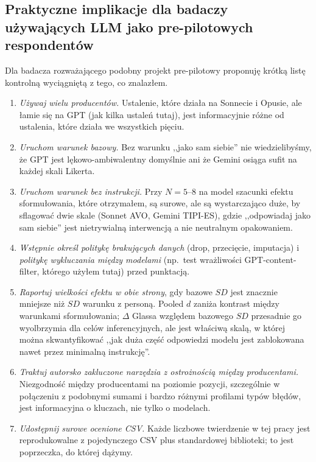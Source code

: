 \documentclass[11pt,a4paper]{article}
\begin{document}
\subsection{Praktyczne implikacje dla badaczy używających LLM jako pre-pilotowych respondentów}

Dla badacza rozważającego podobny projekt pre-pilotowy proponuję krótką listę kontrolną wyciągniętą z tego, co znalazłem.

\begin{enumerate}
\item \emph{Używaj wielu producentów.} Ustalenie, które działa na Sonnecie i Opusie, ale łamie się na GPT (jak kilka ustaleń tutaj), jest informacyjnie różne od ustalenia, które działa we wszystkich pięciu.
\item \emph{Uruchom warunek bazowy.} Bez warunku ,,jako sam siebie'' nie wiedzielibyśmy, że GPT jest lękowo-ambiwalentny domyślnie ani że Gemini osiąga sufit na każdej skali Likerta.
\item \emph{Uruchom warunek bez instrukcji.} Przy $N = 5$--$8$ na model szacunki efektu sformułowania, które otrzymałem, są surowe, ale są wystarczająco duże, by sflagować dwie skale (Sonnet AVO, Gemini TIPI-ES), gdzie ,,odpowiadaj jako sam siebie'' jest nietrywialną interwencją a nie neutralnym opakowaniem.
\item \emph{Wstępnie określ politykę brakujących danych} (drop, przecięcie, imputacja) i \emph{politykę wykluczania między modelami} (np.\ test wrażliwości GPT-content-filter, którego użyłem tutaj) przed punktacją.
\item \emph{Raportuj wielkości efektu w obie strony}, gdy bazowe $SD$ jest znacznie mniejsze niż $SD$ warunku z personą. Pooled $d$ zaniża kontrast między warunkami sformułowania; $\Delta$ Glassa względem bazowego $SD$ przesadnie go wyolbrzymia dla celów inferencyjnych, ale jest właściwą skalą, w której można skwantyfikować ,,jak duża część odpowiedzi modelu jest zablokowana nawet przez minimalną instrukcję''.
\item \emph{Traktuj autorsko zakluczone narzędzia z ostrożnością między producentami.} Niezgodność między producentami na poziomie pozycji, szczególnie w połączeniu z podobnymi sumami i bardzo różnymi profilami typów błędów, jest informacyjna o kluczach, nie tylko o modelach.
\item \emph{Udostępnij surowe ocenione CSV.} Każde liczbowe twierdzenie w tej pracy jest reprodukowalne z pojedynczego CSV plus standardowej biblioteki; to jest poprzeczka, do której dążymy.
\end{enumerate}
\end{document}

